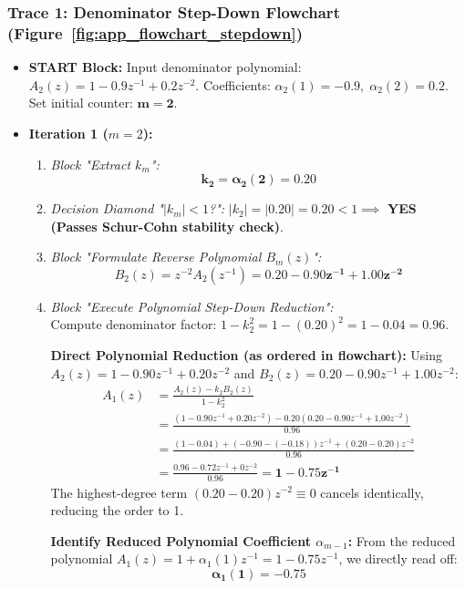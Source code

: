 \documentclass[11pt,a4paper]{article}
\begin{document}
\subsubsection*{Trace 1: Denominator Step-Down Flowchart (Figure~\ref{fig:app_flowchart_stepdown})}
\begin{itemize}
    \item \textbf{START Block:}
    Input denominator polynomial: $A_2(z) = 1 - 0.9 z^{-1} + 0.2 z^{-2}$.
    Coefficients: $\alpha_2(1) = -0.9, \; \alpha_2(2) = 0.2$. Set initial counter: $\mathbf{m = 2}$.

    \item \textbf{Iteration 1 ($m = 2$):}
    \begin{enumerate}
        \item \textit{Block "Extract $k_m$":}
        $$\mathbf{k_2 = \alpha_2(2) = 0.20}$$
        \item \textit{Decision Diamond "$|k_m| < 1$?":}
        $|k_2| = |0.20| = 0.20 < 1 \implies$ \textbf{YES (Passes Schur-Cohn stability check)}.
        \item \textit{Block "Formulate Reverse Polynomial $B_m(z)$":}
        $$B_2(z) = z^{-2} A_2(z^{-1}) = \mathbf{0.20 - 0.90 z^{-1} + 1.00 z^{-2}}$$
        \item \textit{Block "Execute Polynomial Step-Down Reduction":}\\
        Compute denominator factor: $1 - k_2^2 = 1 - (0.20)^2 = 1 - 0.04 = \mathbf{0.96}$.
        
        \textbf{Direct Polynomial Reduction (as ordered in flowchart):}
        Using $A_2(z) = 1 - 0.90 z^{-1} + 0.20 z^{-2}$ and $B_2(z) = 0.20 - 0.90 z^{-1} + 1.00 z^{-2}$:
        \begin{align}
        A_1(z) &= \frac{A_2(z) - k_2 B_2(z)}{1 - k_2^2} \nonumber \\
        &= \frac{(1 - 0.90 z^{-1} + 0.20 z^{-2}) - 0.20(0.20 - 0.90 z^{-1} + 1.00 z^{-2})}{0.96} \nonumber \\
        &= \frac{(1 - 0.04) + (-0.90 - (-0.18)) z^{-1} + (0.20 - 0.20) z^{-2}}{0.96} \nonumber \\
        &= \frac{0.96 - 0.72 z^{-1} + 0 z^{-2}}{0.96} = \mathbf{1 - 0.75 z^{-1}}
        \end{align}
        The highest-degree term $(0.20 - 0.20) z^{-2} \equiv 0$ cancels identically, reducing the order to 1.
        
        \textbf{Identify Reduced Polynomial Coefficient $\alpha_{m-1}$:}
        From the reduced polynomial $A_1(z) = 1 + \alpha_1(1) z^{-1} = 1 - 0.75 z^{-1}$, we directly read off:
        $$\mathbf{\alpha_1(1) = -0.75}$$


\end{enumerate}
\end{itemize}
\end{document}
